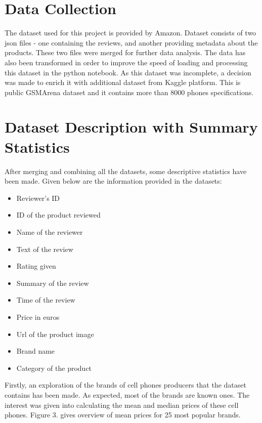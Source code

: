 \documentclass[11pt]{article}
\begin{document}
\section{Data Collection}
The dataset used for this project is provided by Amazon. Dataset consists of two json files - one containing the reviews, and another providing metadata about the products. These two files were merged for further data analysis. The data has also been transformed in order to improve the speed of loading and processing this dataset in the python notebook. As this dataset was incomplete, a decision was made to enrich it with additional dataset from Kaggle platform. This is public GSMArena dataset and it contains more than 8000 phones specifications.


\section{Dataset Description with Summary Statistics}
After merging and combining all the datasets, some descriptive statistics have been made. Given below are the information provided in the datasets:

\begin{itemize}
  \item Reviewer's ID
  \item ID of the product reviewed
  \item Name of the reviewer
  \item Text of the review
  \item Rating given
  \item Summary of the review
  \item Time of the review
  \item Price in euros
  \item Url of the product image
  \item Brand name
  \item Category of the product
\end{itemize}

Firstly, an exploration of the brands of cell phones producers that the dataset contains has been made. As expected, most of the brands are known ones. The interest was given into calculating the mean and median prices of these cell phones. Figure 3. gives overview of mean prices for 25 most popular brands.   
\end{document}
